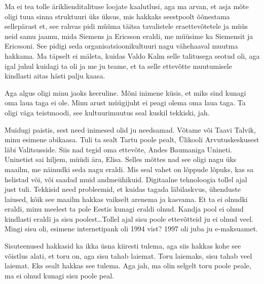 Ma ei tea tolle äriklienditalituse loojate kaalutlusi, aga ma arvan, et asja 
mõte oligi tuua sinna struktuuri üks üksus, mis hakkaks seestpoolt õõnestama 
sellepärast et, see rahvas pidi müüma täitsa tavalistele eraettevõtetele ja 
müüs neid samu jaamu, mida Siemens ja Ericsson eraldi, me müüsime ka Siemensit 
ja Ericssoni. See pidigi seda organisatsioonikultuuri nagu vähehaaval muutma 
hakkama. Ma täpselt ei mäleta, kuidas Valdo Kalm selle 
talitusega seotud oli,  aga igal juhul kuidagi ta oli ja me ju teame, et ta 
selle ettevõtte muutumisele kindlasti aitas hästi palju kaasa. 

Aga algus oligi minu jaoks keeruline. Mõni inimene küsis, et miks sind kunagi 
oma laua taga ei ole. Minu arust müügijuht ei peagi olema oma laua taga. Ta 
oligi väga teistmoodi, see kultuurimuutus seal kuskil tekkiski, jah.


Muidugi paistis, sest need inimesed olid ju needsamad. Võtame või Taavi 
Talvik, minu esimene abikaasa. Tuli ta sealt Tartu 
poole pealt, Ülikooli Arvutuskeskusest läbi 
Valitsusside. Siis nad tegid oma ettevõte, Andes 
Baumaniga Unineti. Uninetist sai hiljem, müüdi ära, 
Elisa. Selles mõttes nad see oligi nagu üks maailm, me näinudki seda nagu 
eraldi. Mis seal vahet on lõppude lõpuks, kas sa helistad või, või  saadad muid 
andmeühikuid. Digitaalne tehnoloogia tollel ajal just tuli. Tekkisid need 
probleemid, et kuidas tagada läbilaskvus, ühenduste laiused, kõik see maailm 
hakkas vaikselt arenema ja kasvama. Et ta ei olnudki eraldi, minu meelest ta 
pole Eestis kunagi eraldi olnud. Kandja pool ei olnud kindlasti eraldi ja sisu 
poolest\ldots Tollel ajal sisu poole ettevõtteid ju ei olnud veel. Mingi sisu 
oli, esimene internetipank oli 1994 vist? 1997 oli juba ju  e-maksuamet.

Sisuteenused hakkasid ka ikka üsna kiiresti tulema, aga siis hakkas kohe see 
võistlus alati, et toru on, aga sisu tahab laiemat. Toru laiemaks, sisu tahab 
veel laiemat. Eks sealt hakkas see tulema. Aga jah, ma olin selgelt toru poole 
peale, ma ei olnud kunagi sisu poole peal.



